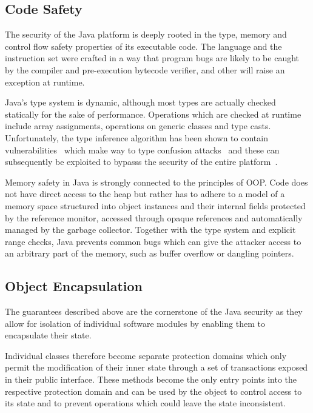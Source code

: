 \documentclass[a4paper,12pt,twoside,openright]{report}
\begin{document}
\subsection{Code Safety}

The security of the Java platform is deeply rooted in the type, memory and control flow safety properties of its executable code. The language and the instruction set were crafted in a way that program bugs are likely to be caught by the compiler and pre-execution bytecode verifier, and other will raise an exception at runtime. 

Java's type system is dynamic, although most types are actually checked statically for the sake of performance. Operations which are checked at runtime include array assignments, operations on generic classes and type casts. Unfortunately, the type inference algorithm has been shown to contain vulnerabilities~\cite{Suenaga:2012:JavaVulnerability} which make way to type confusion attacks~\cite{Oh:2012:JavaExploitReport} and these can subsequently be exploited to bypasss the security of the entire platform~\cite{McGraw:1999:SJG:298616}.

Memory safety in Java is strongly connected to the principles of OOP. Code does not have direct access to the heap but rather has to adhere to a model of a memory space structured into object instances and their internal fields protected by the reference monitor, accessed through opaque references and automatically managed by the garbage collector. Together with the type system and explicit range checks, Java prevents common bugs which can give the attacker access to an arbitrary part of the memory, such as buffer overflow or dangling pointers.

\subsection{Object Encapsulation}

The guarantees described above are the cornerstone of the Java security as they allow for isolation of individual software modules by enabling them to encapsulate their state. 

Individual classes therefore become separate protection domains which only permit the modification of their inner state through a set of transactions exposed in their public interface. These methods become the only entry points into the respective protection domain and can be used by the object to control access to its state and to prevent operations which could leave the state inconsistent.
\end{document}
